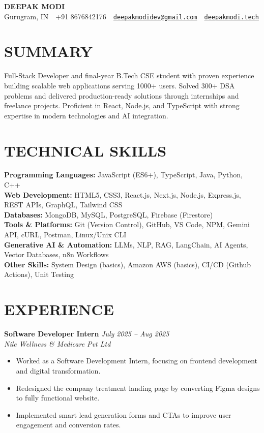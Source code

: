 \documentclass[a4paper,11pt]{article}
\begin{document}
\small
\begin{center}
    {\huge \textbf{DEEPAK MODI}} \\
    \vspace{6pt}
    Gurugram, IN~\textbar~+91 8676842176~\textbar~\href{mailto:deepakmodidev@gmail.com}{\nolinkurl{deepakmodidev@gmail.com}}~\textbar~\href{https://deepakmodi.tech}{\texttt{deepakmodi.tech}}
\end{center}

\section*{SUMMARY}
Full-Stack Developer and final-year B.Tech CSE student with proven experience building scalable web applications serving 1000+ users. Solved 300+ DSA problems and delivered production-ready solutions through internships and freelance projects. Proficient in React, Node.js, and TypeScript with strong expertise in modern technologies and AI integration.

\section*{TECHNICAL SKILLS}
\textbf{Programming Languages:} JavaScript (ES6+), TypeScript, Java, Python, C++ \\
\textbf{Web Development:} HTML5, CSS3, React.js, Next.js, Node.js, Express.js, REST APIs, GraphQL, Tailwind CSS \\
\textbf{Databases:} MongoDB, MySQL, PostgreSQL, Firebase (Firestore) \\
\textbf{Tools \& Platforms:} Git (Version Control), GitHub, VS Code, NPM, Gemini API, cURL, Postman, Linux/Unix CLI \\
\textbf{Generative AI \& Automation:} LLMs, NLP, RAG, LangChain, AI Agents, Vector Databases, n8n Workflows \\
\textbf{Other Skills:} System Design (basics), Amazon AWS (basics), CI/CD (Github Actions), Unit Testing

\section*{EXPERIENCE}
\textbf{Software Developer Intern} \hfill \textit{July 2025 -- Aug 2025} \\
\textit{Nile Wellness \& Medicare Pvt Ltd}
\begin{itemize}
    \item Worked as a Software Development Intern, focusing on frontend development and digital transformation.
    \item Redesigned the company treatment landing page by converting Figma designs to fully functional website.
    \item Implemented smart lead generation forms and CTAs to improve user engagement and conversion rates.
\end{itemize}
\end{document}
